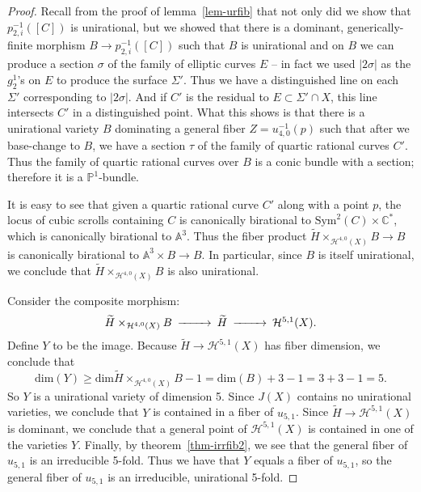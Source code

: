 \documentclass[amssymb,twoside,12 pt,amscd,reqno]{amsart}
\theoremstyle{plain}
\theoremstyle{definition}
\newcommand{\Hdg}[2]{\mathcal{H}^{#1,#2}}
\newcommand{\CC}{\mathbb{C}}
\newcommand{\AAA}{\mathbb{A}}
\newcommand{\PP}{\mathbb{P}}
\def\ps{\vspace{4pt}}
\begin{document}
\begin{proof} Recall from the proof of lemma~\ref{lem-urfib} that not
only did we show that $p_{2,i}^{-1}([C])$ is unirational, but we showed
that there is a dominant, generically-finite morphism $B\rightarrow
p_{2,i}^{-1}([C])$ such that $B$ is unirational and on $B$ we can 
 produce a
section $\sigma$ of the family of elliptic curves $E$ -- in fact we used
$|2\sigma|$ as the $g^1_2$'s on $E$ to produce the surface
$\Sigma'$.  Thus we have a distinguished line on each $\Sigma'$
corresponding to $|2\sigma|$.  And if $C'$ is the residual to
$E\subset \Sigma'\cap X$, this line intersects $C'$ in a distinguished
point.  What this shows is that there is a unirational variety $B$
dominating a general fiber $Z=u_{4,0}^{-1}(p)$ such that after we
base-change to $B$, we have a section $\tau$ of the family of quartic
rational curves $C'$.  Thus the family of quartic rational curves over
$B$ is a conic bundle with a section; therefore it is a
$\PP^1$-bundle.  

\ps

It is easy to see that given a quartic rational curve $C'$ along with
a point $p$, the locus of cubic scrolls containing $C$ is canonically
birational to $\text{Sym}^2(C)\times \CC^*$, which is canonically
birational to $\AAA^3$.  Thus the fiber product
$\widetilde{H} \times_{\Hdg{4}{0}(X)} B\rightarrow B$ is canonically
birational to $\AAA^3\times B\rightarrow B$.  In particular, since $B$
is itself unirational, we conclude that
$\widetilde{H}\times_{\Hdg{4}{0}(X)} B$ is also unirational.

\ps

Consider the
composite morphism:
\begin{equation}\begin{CD}
\widetilde{H}\times_{\Hdg{4}{0}(X)} B @>>> \widetilde{H} @>>>
\Hdg{5}{1}(X).
\end{CD}\end{equation}
Define $Y$ to be the image.  Because $\widetilde{H}\rightarrow
\Hdg{5}{1}(X)$ has fiber dimension, we conclude that 
\begin{equation}\text{dim}(Y)\geq \text{dim}
\widetilde{H}\times_{\Hdg{4}{0}(X)} B - 1 = \text{dim}(B) + 3 -1 = 3+3-1
= 5.\end{equation}
So $Y$ is a unirational variety of dimension 5.  Since $J(X)$ contains
no unirational varieties, we conclude that $Y$ is contained in a fiber
of $u_{5,1}$.  Since $\widetilde{H}\rightarrow \Hdg{5}{1}(X)$ is
dominant, we 
conclude that a general point of $\Hdg{5}{1}(X)$ is contained in one
of the varieties $Y$. 
Finally, by theorem~\ref{thm-irrfib2}, we see that the general fiber of
$u_{5,1}$ is an irreducible 5-fold.  Thus we have that $Y$ equals a
fiber of $u_{5,1}$, so the general fiber of $u_{5,1}$ is an
irreducible, unirational 5-fold.
\end{proof}
\end{document}
